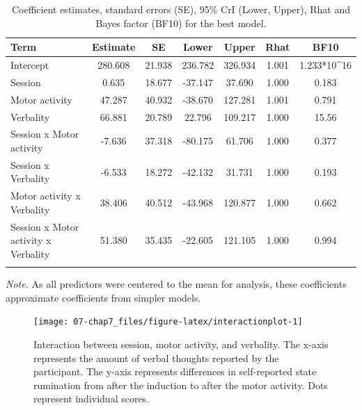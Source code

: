 \documentclass[a4paper,12pt,twoside,onecolumn,openright,final,oldfontcommands]{memoir}
\begin{document}
\begin{table}[H]
\begin{center}
\begin{threeparttable}
\caption{\label{tab:paramexp2}Coefficient estimates, standard errors (SE), 95\% CrI (Lower, Upper), Rhat and Bayes factor (BF10) for the best model.}
\small{
\begin{tabular}{lcccccc}
\toprule
Term & \multicolumn{1}{c}{Estimate} & \multicolumn{1}{c}{SE} & \multicolumn{1}{c}{Lower} & \multicolumn{1}{c}{Upper} & \multicolumn{1}{c}{Rhat} & \multicolumn{1}{c}{BF10}\\
\midrule
Intercept & 280.608 & 21.938 & 236.782 & 326.934 & 1.001 & 1.233*10\textasciicircum{}16\\
Session & 0.635 & 18.677 & -37.147 & 37.690 & 1.000 & 0.183\\
Motor activity & 47.287 & 40.932 & -38.670 & 127.281 & 1.001 & 0.791\\
Verbality & 66.881 & 20.789 & 22.796 & 109.217 & 1.000 & 15.56\\
Session x Motor activity & -7.636 & 37.318 & -80.175 & 61.706 & 1.000 & 0.377\\
Session x Verbality & -6.533 & 18.272 & -42.132 & 31.731 & 1.000 & 0.193\\
Motor activity x Verbality & 38.406 & 40.512 & -43.968 & 120.877 & 1.000 & 0.662\\
Session x Motor activity x Verbality & 51.380 & 35.435 & -22.605 & 121.105 & 1.000 & 0.994\\
\bottomrule
\addlinespace
\end{tabular}
}
\begin{tablenotes}[para]
\textit{Note.} As all predictors were centered to the mean for analysis, these coefficients approximate coefficients from simpler models.
\end{tablenotes}
\end{threeparttable}
\end{center}
\end{table}

\begin{figure}[ht]

{\centering \texttt{[image: 07-chap7\_files/figure-latex/interactionplot-1]} 

}

\caption{Interaction between session, motor activity, and verbality. The x-axis represents the amount of verbal thoughts reported by the participant. The y-axis represents differences in self-reported state rumination from after the induction to after the motor activity. Dots represent individual scores.}\label{fig:interactionplot}
\end{figure}
\end{document}
